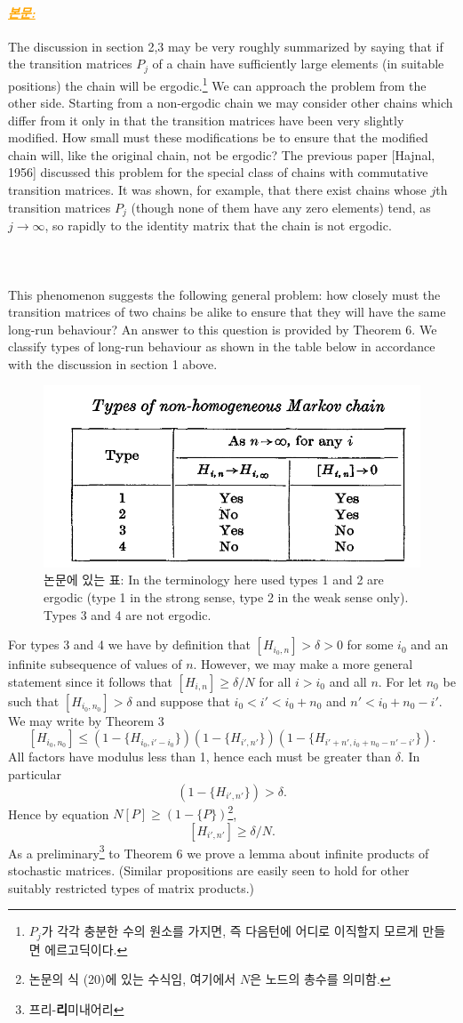 \documentclass[12pt,oneside,english,a4paper]{article}
\def\bk{\paragraph{\LARGE$$}\LARGE}
\newcommand{\paraorange}[1]{\paragraph{\LARGE\textcolor{orange}{\it\underline{\textbf{#1:}}}}\LARGE}
\begin{document}
\paraorange{본문} The discussion in section 2,3 may be very roughly summarized by saying that if the transition matrices $P_j$ of a chain have sufficiently large elements (in suitable positions) the chain will be ergodic.\footnote{$P_j$가 각각 충분한 수의 원소를 가지면, 즉 다음턴에 어디로 이직할지 모르게 만들면 에르고딕이다.} We can approach the problem from the other side. Starting from a non-ergodic chain  we may consider other chains which differ from it only in that the transition matrices have been very slightly modified. How small must these modifications be to ensure that the modified chain will, like the original chain, not be ergodic? The previous paper [Hajnal, 1956] discussed this problem for the special class of chains with commutative transition matrices. It was shown, for example, that there exist chains whose $j$th transition matrices $P_j$ (though none of them have any zero elements) tend, as $j\to\infty$, so rapidly to the identity matrix that the chain is not ergodic. 
\bk This phenomenon suggests the following general problem: how closely must the transition matrices of two chains be alike to ensure that they will have the same long-run behaviour? An answer to this question is provided by Theorem 6. 
We classify types of long-run behaviour as shown in the table below in accordance with the discussion in section 1 above. 
\begin{figure}[h]
\center
\includegraphics[width=1\textwidth]{Fig2.png}
\caption{논문에 있는 표: In the terminology here used types 1 and 2 are ergodic (type 1 in the strong sense, type 2 in the weak sense only). Types 3 and 4 are not ergodic.}
\end{figure}
For types 3 and 4 we have by definition that $[H_{i_0,n}]>\delta>0$ for some $i_0$ and an infinite subsequence of values of $n$. However, we may make a more general statement since it follows that $[H_{i,n}]\geq \delta/N$ for all $i>i_0$ and all $n$. For let $n_0$ be such that $[H_{i_0,n_0}]>\delta$ and suppose that $i_0<i'<i_0+n_0$ and $n'<i_0+n_0-i'$. We may write by Theorem 3 
\[
[H_{i_0,n_0}]\leq (1-\{H_{i_0,i'-i_0}\})(1-\{H_{i',n'}\})(1-\{H_{i'+n',i_0+n_0-n'-i'}\}).
\]
All factors have modulus less than 1, hence each must be greater than $\delta$. In particular 
\[
(1-\{H_{i',n'}\})>\delta.
\]
Hence by equation $N[P]\geq (1-\{P\})$\footnote{논문의 식 (20)에 있는 수식임, 여기에서 $N$은 노드의 총수를 의미함.}, 
\[
[H_{i',n'}]\geq \delta/N.
\]
As a preliminary\footnote{프리-{\bf 리}미내어리} to Theorem 6 we prove a lemma about infinite products of stochastic matrices. (Similar propositions are easily seen to hold for other suitably restricted types of matrix products.) 
\end{document}
